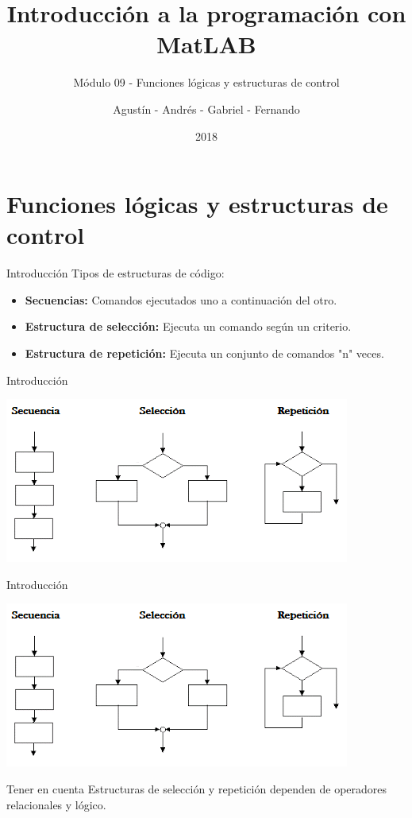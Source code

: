 \documentclass{bredelebeamer}
\title[Programación en MatLAB]{Introducción a la programación con MatLAB}
\subtitle{Módulo 09 - Funciones lógicas y estructuras de control}
\author{Agustín - Andrés - Gabriel - Fernando\inst{1}}
\institute[UTN.BA]
{
  \inst{1}%
  Universidad Tecnológica Nacional\\
  Facultad Regional Buenos Aires
  }
\date{2018}
\begin{document}
\begin{frame}
  \titlepage 
\end{frame}



\section{Funciones lógicas y estructuras de control}

\begin{frame}{Introducción}
Tipos de estructuras de código:
\begin{itemize}
\item \textbf{Secuencias:} Comandos ejecutados uno a continuación del otro.
\item \textbf{Estructura de selección:} Ejecuta un comando según un criterio.
\item \textbf{Estructura de repetición:} Ejecuta un conjunto de comandos "n" veces.
\end{itemize}
\end{frame}

\begin{frame}{Introducción}
\begin{center}
\includegraphics[scale=0.7]{images/pantalla3.png}
\end{center}
\end{frame}

\begin{frame}{Introducción}
\begin{center}
\includegraphics[scale=0.55]{images/pantalla3.png}
\end{center}
\begin{block}{Tener en cuenta}
Estructuras de selección y repetición dependen de operadores relacionales y lógico.
\end{block}
\end{frame}
\end{document}
